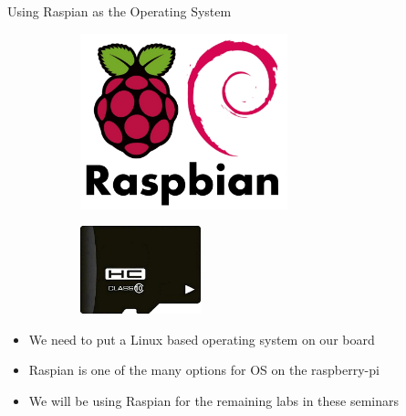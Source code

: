 \begin{frame}
   {Using Raspian as the Operating System}
   \begin{figure}[H]
      \centering
      \begin{subfigure}{0.4\textwidth}
         \centering
         \includegraphics[height=2in]{IMAGES/raspbian-logo}
      \end{subfigure}
      \begin{subfigure}{0.4\textwidth}
         \centering
         \includegraphics[height=1in]{IMAGES/uSD-card}
      \end{subfigure}
   \end{figure}
   \begin{itemize}
      \item We need to put a Linux based operating system on our board
      \item Raspian is one of the many options for OS on the raspberry-pi
      \item We will be using Raspian for the remaining labs in these seminars
   \end{itemize}
\end{frame}

\cprotect{}

